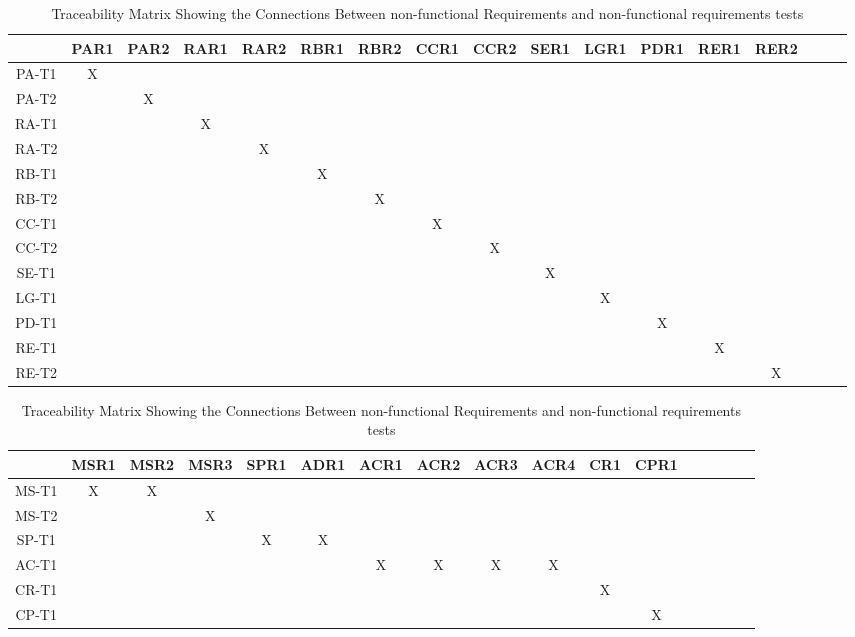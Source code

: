 \documentclass[12pt, oneside, openany, titlepage]{article}
\begin{document}
\begin{landscape}
\begin{table}[h!]
\centering
\begin{tabular}{|c|c|c|c|c|c|c|c|c|c|c|c|c|c|c|c|c|}
\hline
	& PAR1 & PAR2 & RAR1 & RAR2 & RBR1 & RBR2 & CCR1 & CCR2 & SER1 & LGR1 & PDR1 & RER1 & RER2\\
\hline
PA-T1        &X & & & & & & & & & & & & \\ \hline
PA-T2        & &X & & & & & & & & & & & \\ \hline
RA-T1        & & &X & & & & & & & & & & \\ \hline
RA-T2        & & & &X & & & & & & & & & \\ \hline
RB-T1        & & & & &X & & & & & & & & \\ \hline
RB-T2        & & & & & &X & & & & & & & \\ \hline
CC-T1        & & & & & & &X & & & & & & \\ \hline
CC-T2        & & & & & & & &X & & & & & \\ \hline
SE-T1        & & & & & & & & &X & & & & \\ \hline
LG-T1        & & & & & & & & & &X & & & \\ \hline
PD-T1        & & & & & & & & & & &X & & \\ \hline
RE-T1        & & & & & & & & & & & &X & \\ \hline
RE-T2        & & & & & & & & & & & & &X \\ \hline

\end{tabular}
\caption{Traceability Matrix Showing the Connections Between non-functional Requirements and non-functional requirements tests}
\label{Table:A_trace}
\end{table}
\end{landscape}

\begin{landscape}
\begin{table}[h!]
\centering
\begin{tabular}{|c|c|c|c|c|c|c|c|c|c|c|c|c|c|c|c|c|}
\hline
	& MSR1 & MSR2 & MSR3 & SPR1 & ADR1 & ACR1 & ACR2 & ACR3 & ACR4 & CR1 & CPR1 \\
\hline
MS-T1        &X &X & & & & & & & & &  \\ \hline
MS-T2        & & &X & & & & & & & &  \\ \hline
SP-T1        & & & &X &X & & & & & &  \\ \hline
AC-T1        & & & & & & X&X &X &X & & \\ \hline
CR-T1        & & & & & & & & & &X &  \\ \hline
CP-T1        & & & & & & & & & & &X \\ \hline

\end{tabular}
\caption{Traceability Matrix Showing the Connections Between non-functional Requirements and non-functional requirements tests}
\label{Table:A_trace}
\end{table}
\end{landscape}
\end{document}
